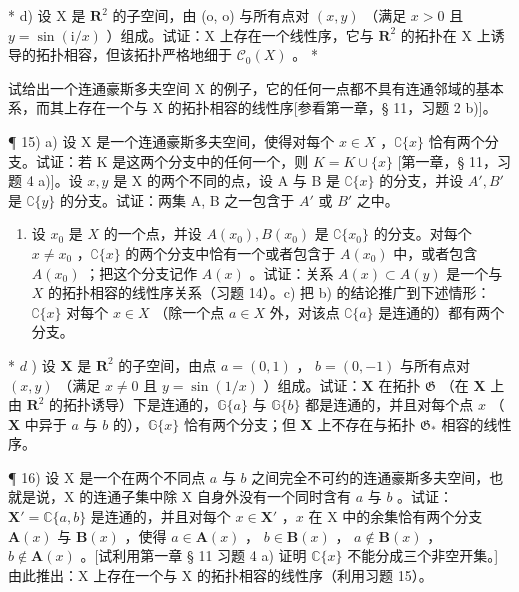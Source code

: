 * d) 设 X 是 \(\mathbf{R}^2\) 的子空间，由 (o, o) 与所有点对 \((x, y)\) （满足 \(x > 0\) 且 \(y = \sin (\mathrm{i} / x)\) ）组成。试证：X 上存在一个线性序，它与 \(\mathbf{R}^2\) 的拓扑在 X 上诱导的拓扑相容，但该拓扑严格地细于 \(\mathcal{C}_0(X)\) 。 *

试给出一个连通豪斯多夫空间 X 的例子，它的任何一点都不具有连通邻域的基本系，而其上存在一个与 X 的拓扑相容的线性序{[}参看第一章，§ 11，习题 2 b){]}。

¶ 15) a) 设 X 是一个连通豪斯多夫空间，使得对每个 \(x \in X\) ，\(\complement\{x\}\) 恰有两个分支。试证：若 K 是这两个分支中的任何一个，则 \(K = K \cup \{x\}\) {[}第一章，§ 11，习题 4 a){]}。设 \(x, y\) 是 X 的两个不同的点，设 A 与 B 是 \(\complement\{x\}\) 的分支，并设 \(A', B'\) 是 \(\complement\{y\}\) 的分支。试证：两集 A, B 之一包含于 \(A'\) 或 \(B'\) 之中。

\begin{enumerate}
\def\labelenumi{\alph{enumi})}
\setcounter{enumi}{1}
\tightlist
\item
设 \(x_0\) 是 \(X\) 的一个点，并设 \(A(x_0), B(x_0)\) 是 \(\complement\{x_0\}\) 的分支。对每个 \(x \neq x_0\) ，\(\complement\{x\}\) 的两个分支中恰有一个或者包含于 \(A(x_0)\) 中，或者包含 \(A(x_0)\) ；把这个分支记作 \(A(x)\) 。试证：关系 \(A(x) \subset A(y)\) 是一个与 \(X\) 的拓扑相容的线性序关系（习题 14）。c) 把 b) 的结论推广到下述情形：\(\complement\{x\}\) 对每个 \(x \in X\) （除一个点 \(a \in X\) 外，对该点 \(\complement\{a\}\) 是连通的）都有两个分支。
\end{enumerate}

* \(d\) ) 设 \(\mathbf{X}\) 是 \(\mathbf{R}^2\) 的子空间，由点 \(a = (0, 1)\) ， \(b = (0, -1)\) 与所有点对 \((x, y)\) （满足 \(x \neq 0\) 且 \(y = \sin(1/x)\) ）组成。试证：\(\mathbf{X}\) 在拓扑 \(\mathfrak{G}\) （在 \(\mathbf{X}\) 上由 \(\mathbf{R}^2\) 的拓扑诱导）下是连通的，\(\mathbb{G}\{a\}\) 与 \(\mathbb{G}\{b\}\) 都是连通的，并且对每个点 \(x\) （ \(\mathbf{X}\) 中异于 \(a\) 与 \(b\) 的），\(\mathbb{G}\{x\}\) 恰有两个分支；但 \(\mathbf{X}\) 上不存在与拓扑 \(\mathfrak{G}_{*}\) 相容的线性序。

¶ 16) 设 X 是一个在两个不同点 \(a\) 与 \(b\) 之间完全不可约的连通豪斯多夫空间，也就是说，X 的连通子集中除 X 自身外没有一个同时含有 \(a\) 与 \(b\) 。试证：\(\mathbf{X}' = \mathbb{C}\{a, b\}\) 是连通的，并且对每个 \(x \in \mathbf{X}'\) ，\(x\) 在 X 中的余集恰有两个分支 \(\mathbf{A}(x)\) 与 \(\mathbf{B}(x)\) ，使得 \(a \in \mathbf{A}(x)\) ， \(b \in \mathbf{B}(x)\) ， \(a \notin \mathbf{B}(x)\) ， \(b \notin \mathbf{A}(x)\) 。{[}试利用第一章 § 11 习题 4 a) 证明 \(\mathbb{C}\{x\}\) 不能分成三个非空开集。{]}由此推出：X 上存在一个与 X 的拓扑相容的线性序（利用习题 15）。

